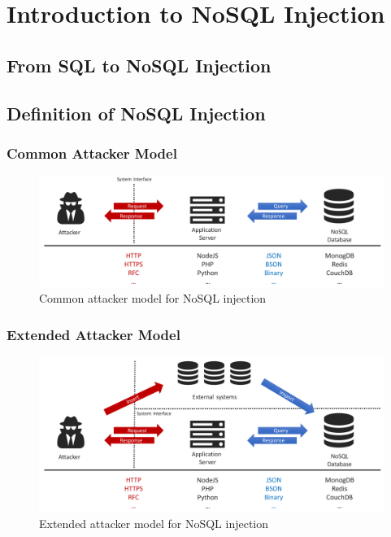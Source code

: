 \chapter{Introduction to NoSQL Injection}

\section{From SQL to NoSQL Injection}

\section{Definition of NoSQL Injection}
\subsection{Common Attacker Model}

\begin{figure}[h]
\centering
  \includegraphics[width=1\linewidth]{Images/attacker_model_normal}
  \caption{Common attacker model for NoSQL injection}
  \label{fig:normalAttackerModel}
\end{figure}

\subsection{Extended Attacker Model}

\begin{figure}[h]
\centering
  \includegraphics[width=1\linewidth]{Images/attacker_model_extended}
  \caption{Extended attacker model for NoSQL injection}
  \label{fig:extendedAttackerModel}
\end{figure}


